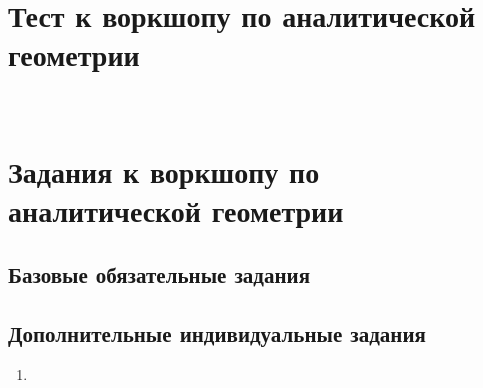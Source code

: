 \documentclass{angem}
\newcommand{\studentpage}[2]{%
    \newpage\setcounter{page}{1}
    \fancyhead[R]{#1}
    \fancyhead[L]{1 ноября 2018 г.}
    \section*{Тест к воркшопу по аналитической геометрии}
        
    \newpage
    \
    \newpage
     \section*{Задания к воркшопу по аналитической геометрии}
      \subsection*{Базовые обязательные задания}
         
      \newpage
    \subsection*{Дополнительные индивидуальные задания}
        \begin{enumerate}
            #2
        \end{enumerate}
}
\def \easyA {
	\item
}
\def \easyB {
	\item
}
\def \hard {
	\item
}
\begin{document}
   \studentpage{Алесь Бінкевіч}{\easyA}
\end{document}
